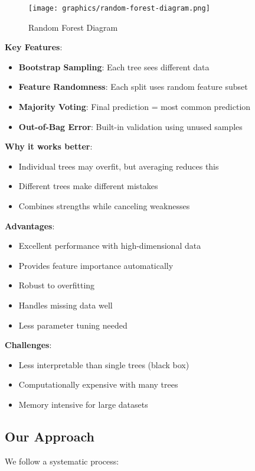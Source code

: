 \begin{figure}[h]
\centering
\texttt{[image: graphics/random-forest-diagram.png]}
\caption{Random Forest Diagram}
\label{fig:random_forest_diagram}
\end{figure}



\textbf{Key Features}:
\begin{itemize}
    \item \textbf{Bootstrap Sampling}: Each tree sees different data
    \item \textbf{Feature Randomness}: Each split uses random feature subset
    \item \textbf{Majority Voting}: Final prediction = most common prediction
    \item \textbf{Out-of-Bag Error}: Built-in validation using unused samples
\end{itemize}

\textbf{Why it works better}:
\begin{itemize}
    \item Individual trees may overfit, but averaging reduces this
    \item Different trees make different mistakes
    \item Combines strengths while canceling weaknesses
\end{itemize}

\textbf{Advantages}:
\begin{itemize}
    \item Excellent performance with high-dimensional data
    \item Provides feature importance automatically
    \item Robust to overfitting
    \item Handles missing data well
    \item Less parameter tuning needed
\end{itemize}

\textbf{Challenges}:
\begin{itemize}
    \item Less interpretable than single trees (black box)
    \item Computationally expensive with many trees
    \item Memory intensive for large datasets
\end{itemize}

\subsection{Our Approach}
We follow a systematic process:

